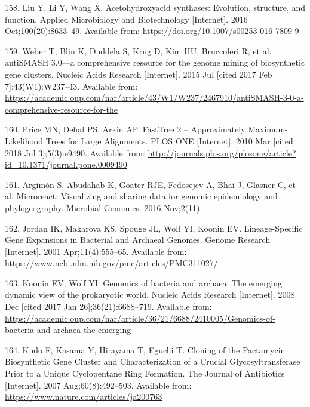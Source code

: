 \documentclass[12pt,twoside]{reedthesis}
\begin{document}
  \hypertarget{ref-liu_acetohydroxyacid_2016}{}
  158. Liu Y, Li Y, Wang X. Acetohydroxyacid synthases: Evolution,
  structure, and function. Applied Microbiology and Biotechnology
  {[}Internet{]}. 2016 Oct;100(20):8633--49. Available from:
  \url{https://doi.org/10.1007/s00253-016-7809-9}
  
  \hypertarget{ref-weber_antismash3_2015}{}
  159. Weber T, Blin K, Duddela S, Krug D, Kim HU, Bruccoleri R, et al.
  antiSMASH 3.0---a comprehensive resource for the genome mining of
  biosynthetic gene clusters. Nucleic Acids Research {[}Internet{]}. 2015
  Jul {[}cited 2017 Feb 7{]};43(W1):W237--43. Available from:
  \url{https://academic.oup.com/nar/article/43/W1/W237/2467910/antiSMASH-3-0-a-comprehensive-resource-for-the}
  
  \hypertarget{ref-price_fasttree_2010}{}
  160. Price MN, Dehal PS, Arkin AP. FastTree 2 -- Approximately
  Maximum-Likelihood Trees for Large Alignments. PLOS ONE {[}Internet{]}.
  2010 Mar {[}cited 2018 Jul 3{]};5(3):e9490. Available from:
  \url{http://journals.plos.org/plosone/article?id=10.1371/journal.pone.0009490}
  
  \hypertarget{ref-argimon_microreact_2016}{}
  161. Argimón S, Abudahab K, Goater RJE, Fedosejev A, Bhai J, Glasner C,
  et al. Microreact: Visualizing and sharing data for genomic epidemiology
  and phylogeography. Microbial Genomics. 2016 Nov;2(11).
  
  \hypertarget{ref-jordan_lineage-specific_2001}{}
  162. Jordan IK, Makarova KS, Spouge JL, Wolf YI, Koonin EV.
  Lineage-Specific Gene Expansions in Bacterial and Archaeal Genomes.
  Genome Research {[}Internet{]}. 2001 Apr;11(4):555--65. Available from:
  \url{https://www.ncbi.nlm.nih.gov/pmc/articles/PMC311027/}
  
  \hypertarget{ref-koonin_genomics_2008}{}
  163. Koonin EV, Wolf YI. Genomics of bacteria and archaea: The emerging
  dynamic view of the prokaryotic world. Nucleic Acids Research
  {[}Internet{]}. 2008 Dec {[}cited 2017 Jan 26{]};36(21):6688--719.
  Available from:
  \url{https://academic.oup.com/nar/article/36/21/6688/2410005/Genomics-of-bacteria-and-archaea-the-emerging}
  
  \hypertarget{ref-kudo_cloning_2007}{}
  164. Kudo F, Kasama Y, Hirayama T, Eguchi T. Cloning of the Pactamycin
  Biosynthetic Gene Cluster and Characterization of a Crucial
  Glycosyltransferase Prior to a Unique Cyclopentane Ring Formation. The
  Journal of Antibiotics {[}Internet{]}. 2007 Aug;60(8):492--503.
  Available from: \url{https://www.nature.com/articles/ja200763}
  
\end{document}
